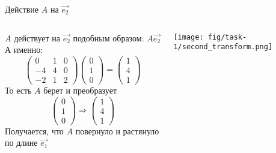 \begin{frame}{Действие $A$ на $\vec{e_{2}}$}
\begin{columns}
\begin{column}{0.5\paperwidth}
$A$ действует на $\vec{e_{2}}$ подобным образом: $A\vec{e_{2}}$ \\
А именно:
\[
\left(\begin{array}{lll}
    0 & 1 & 0  \\
    -4 & 4 & 0  \\ 
    -2 & 1 & 2 
\end{array}\right)
\left(\begin{array}{l}
    0 \\
    1 \\ 
    0 
\end{array}\right) =
\left(\begin{array}{l}
    1 \\
    4 \\
    1
\end{array}\right)
\]
То есть $A$ берет и преобразует
\[
\left(\begin{array}{l}
    0 \\
    1 \\ 
    0 
\end{array}\right) \Rightarrow
\left(\begin{array}{l}
    1 \\
    4 \\
    1
\end{array}\right)
\]
Получается, что $A$ повернуло и растянуло по длине $\vec{e_{1}}$
\end{column}
\begin{column}{0.2\paperwidth}
\texttt{[image: fig/task-1/second\_transform.png]}
\end{column}
\end{columns}
\end{frame}


